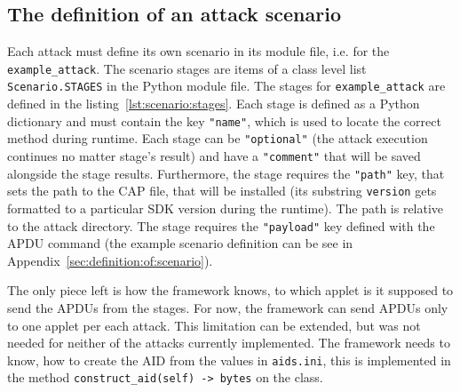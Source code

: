 
                \subsection{The definition of an attack scenario}\label{subsec:scenario:definition}
                Each attack must define its own scenario in its module file, i.e. \examplemodule for the \texttt{example_attack}. The scenario stages are items of a class level list \texttt{Scenario.STAGES} in the Python module file. The stages for \texttt{example_attack} are defined in the listing~\ref{lst:scenario:stages}. Each stage is defined as a Python dictionary and must contain the key \texttt{"name"}, which is used to locate the correct method during runtime. Each stage can be \texttt{"optional"} (the attack execution continues no matter stage's result) and have a \texttt{"comment"} that will be saved alongside the stage results. Furthermore, the \install stage requires the \texttt{"path"} key, that sets the path to the CAP file, that will be installed (its substring \texttt{{version}} gets formatted to a particular SDK version during the runtime). The path is relative to the attack directory. The \send stage requires the \texttt{"payload"} key defined with the APDU command (the example scenario definition can be see in Appendix~\ref{sec:definition:of:scenario}).

    The only piece left is how the framework knows, to which applet is it supposed to send the APDUs from the \send stages. For now, the framework can send APDUs only to one applet per each attack. This limitation can be extended, but was not needed for neither of the attacks currently implemented. The framework needs to know, how to create the AID from the values in \texttt{aids.ini}, this is implemented in the method \texttt{construct_aid(self) -> bytes} on the \attackbuilder class. %



